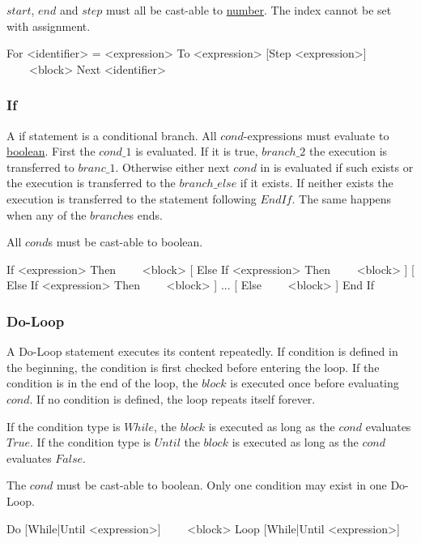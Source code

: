 $start$, $end$ and $step$ must all be cast-able to \hyperref[type:Number]{number}.
The index cannot be set with assignment.

\begin{grammar}
For <identifier> = <expression> To <expression> [Step <expression>]
~~~~<block>
Next <identifier>
\end{grammar}

\subsubsection{If}
\label{stat:if}
A if statement is a conditional branch.
All $cond$-expressions must evaluate to \hyperref[type:Boolean]{boolean}.
First the $cond\_1$ is evaluated.
If it is true,
$branch\_2$ the execution is transferred to $branc\_1$.
Otherwise either next $cond$ in is evaluated if such exists
or the execution is transferred to the $branch\_else$ if it exists.
If neither exists the execution is transferred to the statement following $End If$.
The same happens when any of the $branch$es ends.

All $cond$s must be cast-able to boolean.

\begin{grammar}
If <expression> Then
~~~~<block>
[
Else If <expression> Then
~~~~<block>
]
[
Else If <expression> Then
~~~~<block>
]
...
[
Else
~~~~<block>
]
End If
\end{grammar}

\subsubsection{Do-Loop}
\label{stat:do}
A Do-Loop statement executes its content repeatedly.
If condition is defined in the beginning,
the condition is first checked before entering the loop.
If the condition is in the end of the loop,
the $block$ is executed once before evaluating $cond$.
If no condition is defined,
the loop repeats itself forever.

If the condition type is $While$,
the $block$ is executed as long as the $cond$ evaluates $True$.
If the condition type is $Until$
the $block$ is executed as long as the $cond$ evaluates $False$.

The $cond$ must be cast-able to boolean.
Only one condition may exist in one Do-Loop.

\begin{grammar}
Do [While|Until <expression>]
~~~~<block>
Loop [While|Until <expression>]
\end{grammar}

